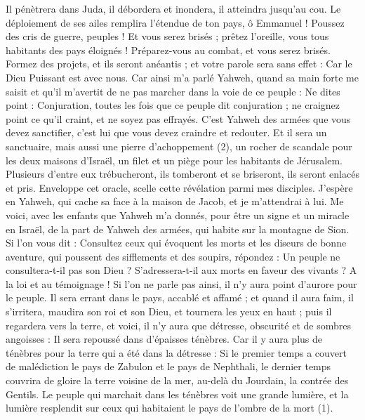 \begin{multicols}{2}
Il pénètrera dans Juda, il débordera et inondera, il atteindra jusqu’au cou. Le déploiement de ses ailes remplira l’étendue de ton pays, ô Emmanuel !
Poussez des cris de guerre, peuples ! Et vous serez brisés ; prêtez l'oreille, vous tous habitants des pays éloignés ! Préparez-vous au combat, et vous serez brisés.
Formez des projets, et ils seront anéantis ; et votre parole sera sans effet : Car le Dieu Puissant est avec nous.
Car ainsi m'a parlé Yahweh, quand sa main forte me saisit et qu’il m’avertit de ne pas marcher dans la voie de ce peuple :
Ne dites point : Conjuration, toutes les fois que ce peuple dit conjuration ; ne craignez point ce qu'il craint, et ne soyez pas effrayés.
C’est Yahweh des armées que vous devez sanctifier, c’est lui que vous devez craindre et redouter.
Et il sera un sanctuaire, mais aussi une pierre d'achoppement (2), un rocher de scandale pour les deux maisons d'Israël, un filet et un piège pour les habitants de Jérusalem.
Plusieurs d’entre eux trébucheront, ils tomberont et se briseront, ils seront enlacés et pris.
Enveloppe cet oracle, scelle cette révélation parmi mes disciples.
J’espère en Yahweh, qui cache sa face à la maison de Jacob, et je m'attendrai à lui.
Me voici, avec les enfants que Yahweh m'a donnés, pour être un signe et un miracle en Israël, de la part de Yahweh des armées, qui habite sur la montagne de Sion.
Si l’on vous dit : Consultez ceux qui évoquent les morts et les diseurs de bonne aventure, qui poussent des sifflements et des soupirs, répondez : Un peuple ne consultera-t-il pas son Dieu ? S’adressera-t-il aux morts en faveur des vivants ?
A la loi et au témoignage ! Si l’on ne parle pas ainsi, il n’y aura point d’aurore pour le peuple.
Il sera errant dans le pays, accablé et affamé ; et quand il aura faim, il s’irritera, maudira son roi et son Dieu, et tournera les yeux en haut ;
puis il regardera vers la terre, et voici, il n’y aura que détresse, obscurité et de sombres angoisses : Il sera repoussé dans d’épaisses ténèbres.
Car il y aura plus de ténèbres pour la terre qui a été dans la détresse : Si le premier temps a couvert de malédiction le pays de Zabulon et le pays de Nephthali, le dernier temps couvrira de gloire la terre voisine de la mer, au-delà du Jourdain, la contrée des Gentils.
\VerseOne{}Le peuple qui marchait dans les ténèbres voit une grande lumière, et la lumière resplendit sur ceux qui habitaient le pays de l'ombre de la mort (1).

\end{multicols}
